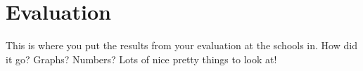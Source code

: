 \chapter{Evaluation}
\label{chap:evaluation}
\onehalfspacing
	
This is where you put the results from your evaluation at the schools in.
How did it go? Graphs? Numbers? Lots of nice pretty things to look at!